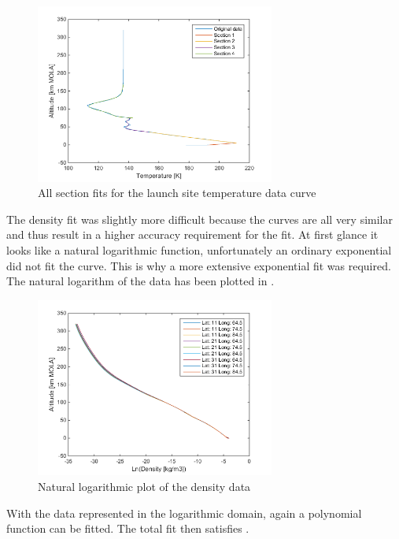 \begin{figure}[H]
\centering
\includegraphics[width=0.7\textwidth]{figures/software/completePolyFitTempSplit5.png}
\caption{All section fits for the launch site temperature data curve}
\label{fig:completePolyFitTempSplit5}
\end{figure}



\noindent
The density fit was slightly more difficult because the curves are all very similar and thus result in a higher accuracy requirement for the fit. At first glance it looks like a natural logarithmic function, unfortunately an ordinary exponential did not fit the curve. This is why a more extensive exponential fit was required. The natural logarithm of the data has been plotted in .

\begin{figure}[H]
\centering
\includegraphics[width=0.7\textwidth]{figures/software/lnPlotDataDen.png}
\caption{Natural logarithmic plot of the density data}
\label{fig:lnPlotDataDen}
\end{figure}

\noindent
With the data represented in the logarithmic domain, again a polynomial function can be fitted. The total fit then satisfies .

